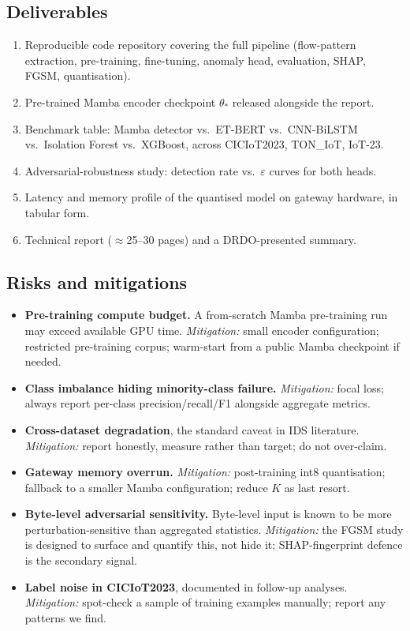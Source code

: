 \documentclass[11pt,a4paper]{article}
\begin{document}
\subsection{Deliverables}
\begin{enumerate}[leftmargin=*, itemsep=2pt]
  \item Reproducible code repository covering the full pipeline (flow-pattern extraction, pre-training, fine-tuning, anomaly head, evaluation, SHAP, FGSM, quantisation).
  \item Pre-trained Mamba encoder checkpoint $\theta_*$ released alongside the report.
  \item Benchmark table: Mamba detector vs.\ ET-BERT vs.\ CNN-BiLSTM vs.\ Isolation Forest vs.\ XGBoost, across CICIoT2023, TON\_IoT, IoT-23.
  \item Adversarial-robustness study: detection rate vs.\ $\varepsilon$ curves for both heads.
  \item Latency and memory profile of the quantised model on gateway hardware, in tabular form.
  \item Technical report ($\approx$25--30 pages) and a DRDO-presented summary.
\end{enumerate}

\subsection{Risks and mitigations}
\begin{itemize}[leftmargin=*, itemsep=2pt]
  \item \textbf{Pre-training compute budget.} A from-scratch Mamba pre-training run may exceed available GPU time. \emph{Mitigation:} small encoder configuration; restricted pre-training corpus; warm-start from a public Mamba checkpoint if needed.
  \item \textbf{Class imbalance hiding minority-class failure.} \emph{Mitigation:} focal loss; always report per-class precision/recall/F1 alongside aggregate metrics.
  \item \textbf{Cross-dataset degradation}, the standard caveat in IDS literature. \emph{Mitigation:} report honestly, measure rather than target; do not over-claim.
  \item \textbf{Gateway memory overrun.} \emph{Mitigation:} post-training int8 quantisation; fallback to a smaller Mamba configuration; reduce $K$ as last resort.
  \item \textbf{Byte-level adversarial sensitivity.} Byte-level input is known to be more perturbation-sensitive than aggregated statistics. \emph{Mitigation:} the FGSM study is designed to surface and quantify this, not hide it; SHAP-fingerprint defence is the secondary signal.
  \item \textbf{Label noise in CICIoT2023}, documented in follow-up analyses. \emph{Mitigation:} spot-check a sample of training examples manually; report any patterns we find.
\end{itemize}
\end{document}
